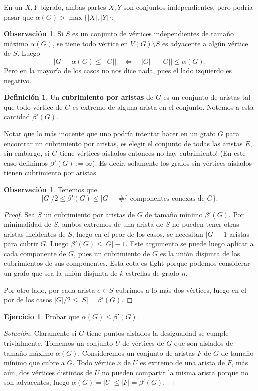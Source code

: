\documentclass[12pt]{report}
\theoremstyle{plain}
\theoremstyle{definition}
\newtheorem{definition}[theorem]{Definición}
\newtheorem{obs}[theorem]{Observación}
\newtheorem{exercise}[theorem]{Ejercicio}
\newenvironment{solution}{\begin{proof}[Solución]}{\end{proof}}
\newcommand{\abs}[1]{\left \vert #1 \right \vert}
\newcommand{\Abs}[1]{\left \vert \left \vert #1 \right \vert \right \vert}
\begin{document}
En un $X,Y$-bigrafo, ambas partes $X,Y$ son conjuntos independientes, pero podría pasar que $\alpha (G) > \max \{ \abs X, \abs Y \}$:

\begin{obs}
Si $S$ es un conjunto de vértices independientes de tamaño máximo $\alpha (G)$, se tiene todo vértice en $V(G) \setminus S$ es adyacente a algún vértice de $S$. Luego
\[
    \abs G - \alpha (G) \leq \Abs G \quad \Leftrightarrow \quad \abs G - \Abs G \leq \alpha (G).
\]
Pero en la mayoría de los casos no nos dice nada, pues el lado izquierdo es negativo.
\end{obs}

\begin{definition}
Un \textbf{cubrimiento por aristas} de $G$ es un conjunto de aristas tal que todo vértice de $G$ es extremo de alguna arista en el conjunto. Notemos a esta cantidad $\beta ' (G)$.
\end{definition}
Notar que lo más inocente que uno podría intentar hacer en un grafo $G$ para encontrar un cubrimiento por aristas, es elegir el conjunto de todas las aristas $E$, sin embargo, si $G$ tiene vértices aislados entonces no hay cubrimiento! (En este caso definimos $\beta ' (G) := \infty$). Es decir, solamente los grafos sin vértices aislados tienen cubrimiento por aristas.

\begin{obs}
Tenemos que
\[
    \abs G / 2 \leq \beta ' (G) \leq \abs G - \#\{\text{ componentes conexas de $G$}\}.
\]
\end{obs}
\begin{proof}
Sea $S$ un cubrimiento por aristas de $G$ de tamaño mínimo $\beta ' (G)$. Por minimalidad de $S$, ambos extremos de una arista de $S$ no pueden tener otras aristas incidentes de $S$, luego en el peor de los casos, se necesitan $\abs G -1$ aristas para cubrir $G$. Luego $\beta ' (G) \leq \abs G -1$. Este argumento se puede luego aplicar a cada componente de $G$, pues un cubrimiento de $G$ es la unión disjunta de los cubrimientos de sus componentes. Esta cota es tight porque podemos considerar un grafo que sea la unión disjunta de $k$ estrellas de grado $n$.

Por otro lado, por cada arista $e \in S$ cubrimos a lo más dos vértices, luego en el por de los casos $\abs G / 2 \leq \abs S = \beta ' (G)$.
\end{proof}

\begin{exercise}
Probar que $\alpha (G) \leq \beta ' (G)$.
\end{exercise}
\begin{solution}
Claramente si $G$ tiene puntos aislados la desigualdad se cumple trivialmente. Tomemos un conjunto $U$ de vértices de $G$ que son aislados de tamaño máximo $\alpha (G)$. Consideremos un conjunto de aristas $F$ de $G$ de tamaño mínimo que cubre a $G$. Todo vértice $x$ de $U$ es extremo de una arista de $F$, más aún, dos vértices distintos de $U$ no pueden compartir la misma arista porque no son adyacentes, luego $\alpha (G) = \abs U \leq \abs F =  \beta ' (G)$.
\end{solution}
\end{document}

